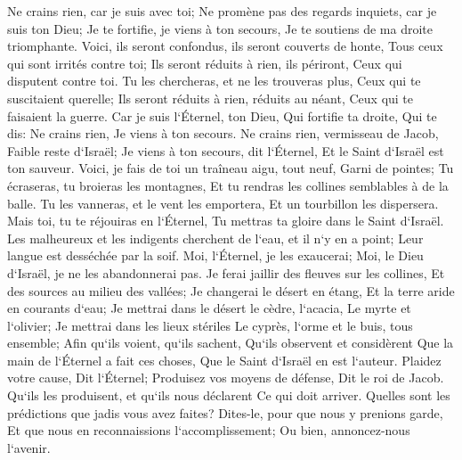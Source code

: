 \verse Ne crains rien, car je suis avec toi; Ne promène pas des regards inquiets, car je suis ton Dieu; Je te fortifie, je viens à ton secours, Je te soutiens de ma droite triomphante. 
\verse Voici, ils seront confondus, ils seront couverts de honte, Tous ceux qui sont irrités contre toi; Ils seront réduits à rien, ils périront, Ceux qui disputent contre toi. 
\verse Tu les chercheras, et ne les trouveras plus, Ceux qui te suscitaient querelle; Ils seront réduits à rien, réduits au néant, Ceux qui te faisaient la guerre. 
\verse Car je suis l`Éternel, ton Dieu, Qui fortifie ta droite, Qui te dis: Ne crains rien, Je viens à ton secours. 
\verse Ne crains rien, vermisseau de Jacob, Faible reste d`Israël; Je viens à ton secours, dit l`Éternel, Et le Saint d`Israël est ton sauveur. 
\verse Voici, je fais de toi un traîneau aigu, tout neuf, Garni de pointes; Tu écraseras, tu broieras les montagnes, Et tu rendras les collines semblables à de la balle. 
\verse Tu les vanneras, et le vent les emportera, Et un tourbillon les dispersera. Mais toi, tu te réjouiras en l`Éternel, Tu mettras ta gloire dans le Saint d`Israël. 
\verse Les malheureux et les indigents cherchent de l`eau, et il n`y en a point; Leur langue est desséchée par la soif. Moi, l`Éternel, je les exaucerai; Moi, le Dieu d`Israël, je ne les abandonnerai pas. 
\verse Je ferai jaillir des fleuves sur les collines, Et des sources au milieu des vallées; Je changerai le désert en étang, Et la terre aride en courants d`eau; 
\verse Je mettrai dans le désert le cèdre, l`acacia, Le myrte et l`olivier; Je mettrai dans les lieux stériles Le cyprès, l`orme et le buis, tous ensemble; 
\verse Afin qu`ils voient, qu`ils sachent, Qu`ils observent et considèrent Que la main de l`Éternel a fait ces choses, Que le Saint d`Israël en est l`auteur. 
\verse Plaidez votre cause, Dit l`Éternel; Produisez vos moyens de défense, Dit le roi de Jacob. 
\verse Qu`ils les produisent, et qu`ils nous déclarent Ce qui doit arriver. Quelles sont les prédictions que jadis vous avez faites? Dites-le, pour que nous y prenions garde, Et que nous en reconnaissions l`accomplissement; Ou bien, annoncez-nous l`avenir. 

